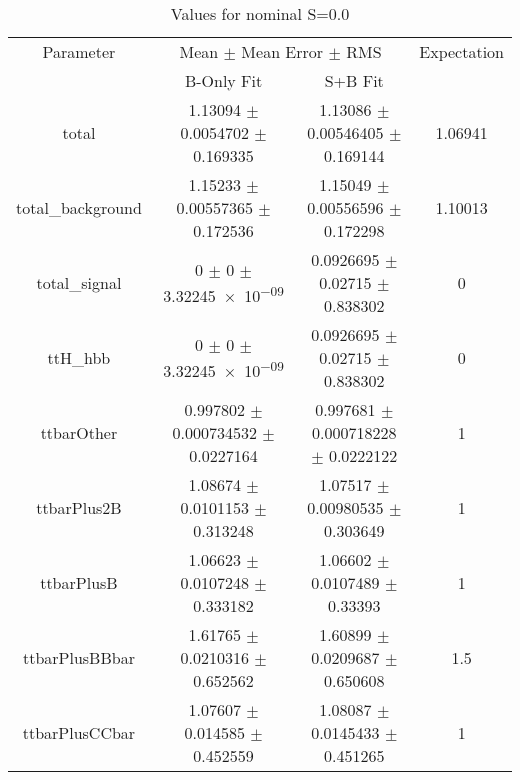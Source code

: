 \begin{table}
\centering
\caption{Values for nominal S=0.0}
\begin{tabular}{cccc}
\toprule
Parameter & \multicolumn{2}{c}{Mean $\pm$ Mean Error $\pm$ RMS} & Expectation\\
 & B-Only Fit & S+B Fit & \\
\midrule
total & \num{1.13094} $\pm$ \num{0.0054702} $\pm$ \num{0.169335} & \num{1.13086} $\pm$ \num{0.00546405} $\pm$ \num{0.169144} & \num{1.06941}\\
total\_background & \num{1.15233} $\pm$ \num{0.00557365} $\pm$ \num{0.172536} & \num{1.15049} $\pm$ \num{0.00556596} $\pm$ \num{0.172298} & \num{1.10013}\\
total\_signal & \num{0} $\pm$ \num{0} $\pm$ \num{3.32245e-09} & \num{0.0926695} $\pm$ \num{0.02715} $\pm$ \num{0.838302} & \num{0}\\
ttH\_hbb & \num{0} $\pm$ \num{0} $\pm$ \num{3.32245e-09} & \num{0.0926695} $\pm$ \num{0.02715} $\pm$ \num{0.838302} & \num{0}\\
ttbarOther & \num{0.997802} $\pm$ \num{0.000734532} $\pm$ \num{0.0227164} & \num{0.997681} $\pm$ \num{0.000718228} $\pm$ \num{0.0222122} & \num{1}\\
ttbarPlus2B & \num{1.08674} $\pm$ \num{0.0101153} $\pm$ \num{0.313248} & \num{1.07517} $\pm$ \num{0.00980535} $\pm$ \num{0.303649} & \num{1}\\
ttbarPlusB & \num{1.06623} $\pm$ \num{0.0107248} $\pm$ \num{0.333182} & \num{1.06602} $\pm$ \num{0.0107489} $\pm$ \num{0.33393} & \num{1}\\
ttbarPlusBBbar & \num{1.61765} $\pm$ \num{0.0210316} $\pm$ \num{0.652562} & \num{1.60899} $\pm$ \num{0.0209687} $\pm$ \num{0.650608} & \num{1.5}\\
ttbarPlusCCbar & \num{1.07607} $\pm$ \num{0.014585} $\pm$ \num{0.452559} & \num{1.08087} $\pm$ \num{0.0145433} $\pm$ \num{0.451265} & \num{1}\\
\bottomrule
\end{tabular}
\end{table}